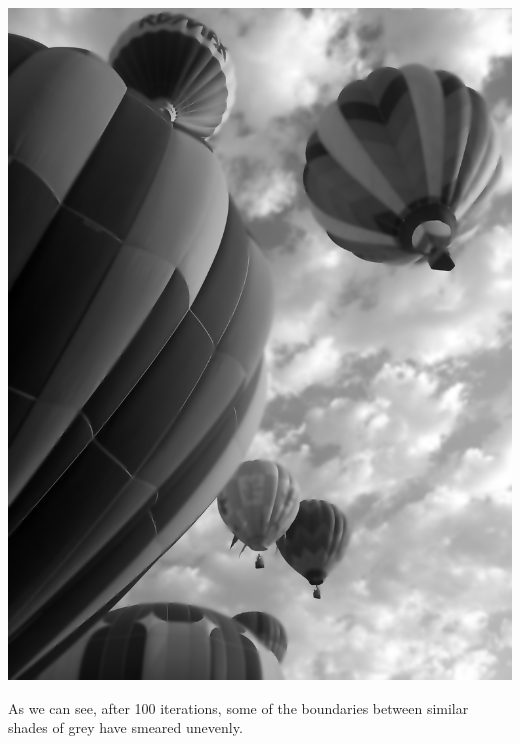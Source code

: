 \includegraphics[width=\textwidth]{baloons100}

As we can see, after 100 iterations, some of the boundaries between similar shades of grey have smeared unevenly.